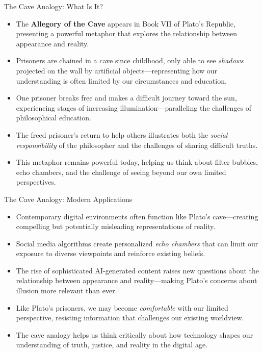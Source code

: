 \documentclass[aspectratio=169]{beamer}
\begin{document}
\begin{frame}{The Cave Analogy: What Is It?}
\begin{itemize}
\item The \textbf{Allegory of the Cave} appears in Book VII of Plato's Republic, presenting a powerful metaphor that explores the relationship between appearance and reality.
\item Prisoners are chained in a cave since childhood, only able to see \emph{shadows} projected on the wall by artificial objects—representing how our understanding is often limited by our circumstances and education.
\item One prisoner breaks free and makes a difficult journey toward the sun, experiencing stages of increasing illumination—paralleling the challenges of philosophical education.
\item The freed prisoner's return to help others illustrates both the \emph{social responsibility} of the philosopher and the challenges of sharing difficult truths.
\item This metaphor remains powerful today, helping us think about filter bubbles, echo chambers, and the challenge of seeing beyond our own limited perspectives.
\end{itemize}
\end{frame}

\begin{frame}{The Cave Analogy: Modern Applications}
\begin{itemize}
\item Contemporary digital environments often function like Plato's cave—creating compelling but potentially misleading representations of reality.
\item Social media algorithms create personalized \emph{echo chambers} that can limit our exposure to diverse viewpoints and reinforce existing beliefs.
\item The rise of sophisticated AI-generated content raises new questions about the relationship between appearance and reality—making Plato's concerns about illusion more relevant than ever.
\item Like Plato's prisoners, we may become \emph{comfortable} with our limited perspective, resisting information that challenges our existing worldview.
\item The cave analogy helps us think critically about how technology shapes our understanding of truth, justice, and reality in the digital age.
\end{itemize}
\end{frame}
\end{document}
